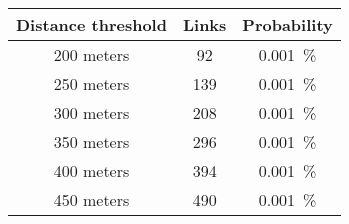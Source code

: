 \begin{table}[H]
    \centering
    \begin{tabular}{|c|c|c|}
        \hline
        Distance threshold & Links & Probability \\\hline %
        200 meters         & 92    & 0.001~\%    \\\hline %
        250 meters         & 139   & 0.001~\%    \\\hline %
        300 meters         & 208   & 0.001~\%    \\\hline %
        350 meters         & 296   & 0.001~\%    \\\hline %
        400 meters         & 394   & 0.001~\%    \\\hline %
        450 meters         & 490   & 0.001~\%    \\\hline %

\end{tabular}
\end{table}
